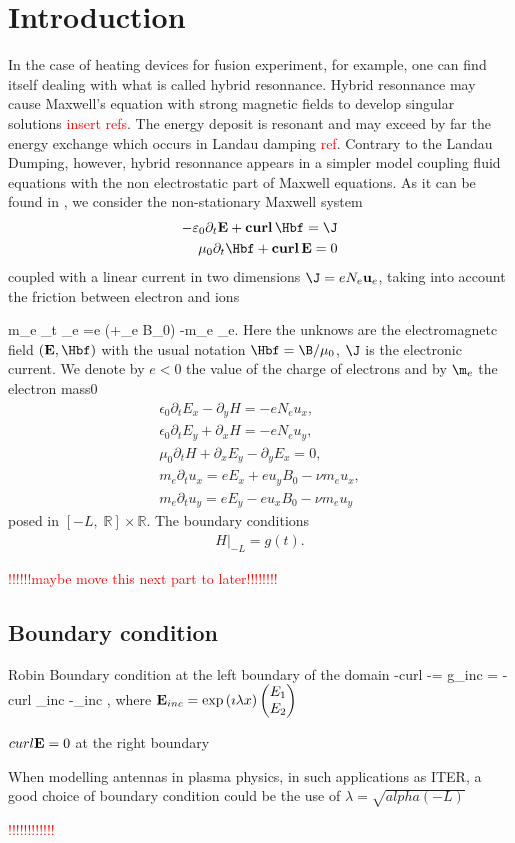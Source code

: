 \section{Introduction}



 In the case of heating devices for fusion experiment, for example, one can find itself dealing with what is called hybrid resonnance. Hybrid resonnance may cause Maxwell's equation with strong magnetic fields to develop singular solutions \textcolor{red}{insert refs}. The energy deposit is resonant and may exceed by far the energy exchange which occurs in Landau damping \textcolor{red}{ref}. Contrary to the Landau Dumping, however, hybrid resonnance appears in a simpler model coupling fluid equations with the non electrostatic part of Maxwell equations.
 As it can be found in \cite{stable_yee_plasma_current}, we consider the non-stationary Maxwell system 
 \begin{align}
 -\varepsilon_0 \partial_t \E + \curl\, \Hbf = \J\\
 \mu_0 \partial_t \Hbf + \curl\,  \E = 0
 \end{align}
 coupled with a linear current in two dimensions $\J = eN_e \ubf_e$, taking into account the friction between electron and ions
 
 \be
 m_e \partial_t \ubf_e =e (\E +\ubf_e \nabla B_0) -m_e \nu \ubf_e. \label{eq:electronmove}
 \ee
 Here the unknows are the electromagnetc field $(\E,\Hbf)$ with the usual notation $\Hbf = \B/\mu_0$, $\J$ is the electronic current. We denote by $e<0$ the value of the charge of electrons and by $\m_e$ the electron mass0
  \begin{align}
\epsilon_0\partial_t E_{x}-\partial_y H=-eN_e u_x,\nonumber\\
\epsilon_0\partial_t E_{y}+\partial_x H=-eN_e u_y,\nonumber\\
\mu_0\partial_t H+\partial_x E_y-\partial_y E_x=0,\\
m_e\partial_t u_x=eE_x+eu_yB_0-\nu m_e u_x,\nonumber\\
m_e\partial_t u_y=eE_y-eu_xB_0-\nu m_e u_y\nonumber
\end{align}
posed in $[-L,\; \mathbb{R}]\times \mathbb{R}$. The boundary conditions 
\begin{align*}
 H|_{-L}=g(t).
\end{align*}

\textcolor{red}{!!!!!!maybe move this next part to later!!!!!!!!}
\subsection{Boundary condition}
Robin Boundary condition at the left boundary of the domain
\be
-curl \E -\imath \lambda\E \wedge \n = g_{inc} = -curl \E_{inc} -\imath \lambda\E_{inc} \wedge \n,
\ee
where  ${\bf E}_{inc} = \exp \left(\imath \lambda x\right)\begin{pmatrix} E_1\\ E_2 \end{pmatrix}$

$curl {\bf E} = 0$ at the right boundary
\begin{remark}
When modelling antennas in plasma physics, in such applications as ITER, a good choice of boundary condition could be the use of $\lambda = \sqrt{alpha(-L)}$
\end{remark}
\textcolor{red}{!!!!!!!!!!!!}